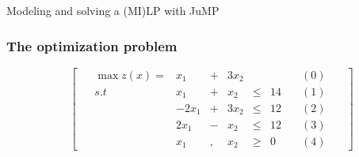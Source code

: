 \documentclass[]{beamer}
\begin{document}
%
%
%


% 
%
\begin{frame}

\begin{center} 
\Large{Modeling and solving a (MI)LP with JuMP}
\end{center}
              
\end{frame}

% 
%

\begin{frame}
  \frametitle{The optimization problem}
\vspace{3mm}


$$\quad \left[ \ \begin{array}{crcrccc}
\quad  \max z(x) = & x_1 &+& 3x_2 &   &    & \quad (0)\quad \  \\
\quad  s.t &         x_1 &+&  x_2 &\le& 14 & \quad (1)\quad \ \\
    &       -2x_1 &+& 3x_2 &\le& 12 & \quad (2)\quad \ \\
    &        2x_1 &-&  x_2 &\le& 12 & \quad (3)\quad \ \\
    &         x_1 &,&  x_2 &\ge& 0  & \quad (4)\quad \
 \end{array}\ \right]
$$

\end{frame}
\end{document}
